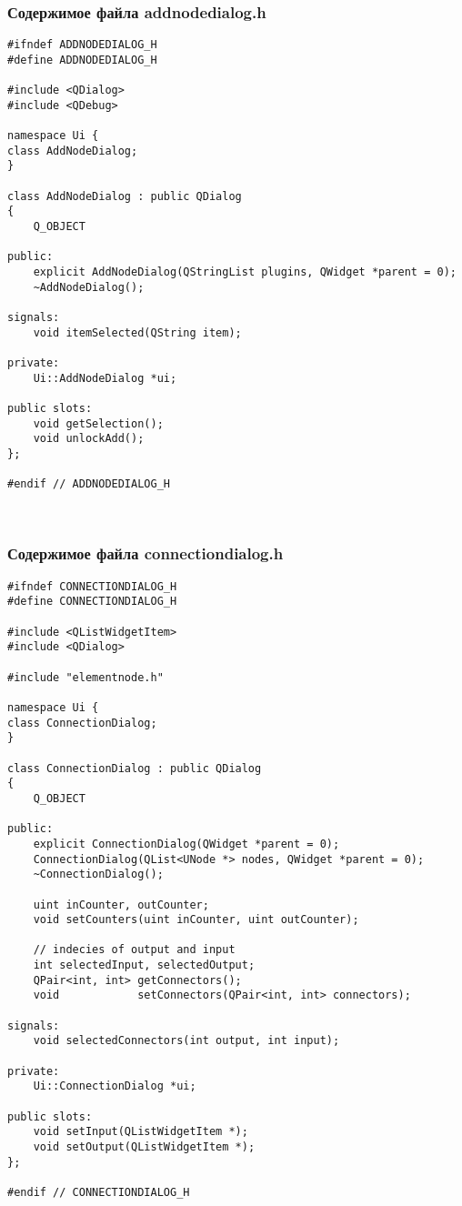 \lstset{
  basicstyle=\ttfamily\scriptsize
}

\subsubsection*{Содержимое файла addnodedialog.h}

\begin{lstlisting}
#ifndef ADDNODEDIALOG_H
#define ADDNODEDIALOG_H

#include <QDialog>
#include <QDebug>

namespace Ui {
class AddNodeDialog;
}

class AddNodeDialog : public QDialog
{
    Q_OBJECT

public:
    explicit AddNodeDialog(QStringList plugins, QWidget *parent = 0);
    ~AddNodeDialog();

signals:
    void itemSelected(QString item);

private:
    Ui::AddNodeDialog *ui;

public slots:
    void getSelection();
    void unlockAdd();
};

#endif // ADDNODEDIALOG_H
\end{lstlisting}~\\

\subsubsection*{Содержимое файла connectiondialog.h}

\begin{lstlisting}
#ifndef CONNECTIONDIALOG_H
#define CONNECTIONDIALOG_H

#include <QListWidgetItem>
#include <QDialog>

#include "elementnode.h"

namespace Ui {
class ConnectionDialog;
}

class ConnectionDialog : public QDialog
{
    Q_OBJECT

public:
    explicit ConnectionDialog(QWidget *parent = 0);
    ConnectionDialog(QList<UNode *> nodes, QWidget *parent = 0);
    ~ConnectionDialog();

    uint inCounter, outCounter;
    void setCounters(uint inCounter, uint outCounter);

    // indecies of output and input
    int selectedInput, selectedOutput;
    QPair<int, int> getConnectors();
    void            setConnectors(QPair<int, int> connectors);

signals:
    void selectedConnectors(int output, int input);

private:
    Ui::ConnectionDialog *ui;

public slots:
    void setInput(QListWidgetItem *);
    void setOutput(QListWidgetItem *);
};

#endif // CONNECTIONDIALOG_H
\end{lstlisting}~\\

